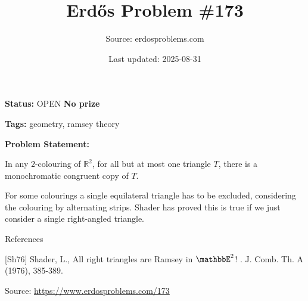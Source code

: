 \documentclass{article}
\title{Erd\H{o}s Problem \#173}
\date{Last updated: 2025-08-31}
\author{Source: erdosproblems.com}
\begin{document}
\maketitle

\noindent\textbf{Status:} OPEN \quad \textbf{No prize}

\noindent\textbf{Tags:} geometry, ramsey theory

\medskip

\noindent\textbf{Problem Statement:}

In any $2$-colouring of $\mathbb{R}^2$, for all but at most one triangle $T$, there is a monochromatic congruent copy of $T$.




For some colourings a single equilateral triangle has to be excluded, considering the colouring by alternating strips. Shader \cite{Sh76} has proved this is true if we just consider a single right-angled triangle.




References

[Sh76] Shader, L., All right triangles are Ramsey in $\mathbbE^2$! . J. Comb. Th. A (1976), 385-389.


\bigskip
\noindent\small{Source: \url{https://www.erdosproblems.com/173}}
\end{document}
